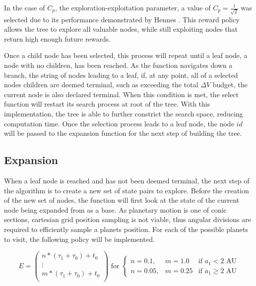 \documentclass[letterpaper, preprint, paper,11pt]{AAS}	%
\begin{document}
In the case of $C_p$, the exploration-exploitation parameter, a value of $C_p = \frac{1}{\sqrt{2}}$ was selected due to its performance demonstrated by Hennes \cite{Hennes2015}. This reward policy allows the tree to explore all valuable nodes, while still exploiting nodes that return high enough future rewards.

Once a child node has been selected, this process will repeat until a leaf node, a node with no children, has been reached. As the function navigates down a branch, the string of nodes leading to a leaf, if, at any point, all of a selected nodes children are deemed terminal, such as exceeding the total $\Delta V$ budget, the current node is also declared terminal. When this condition is met, the select function will restart its search process at root of the tree. With this implementation, the tree is able to further constrict the search space, reducing computation time. Once the selection process leads to a leaf node, the node $id$ will be passed to the expansion function for the next step of building the tree. %

\subsection{Expansion}
When a leaf node is reached and has not been deemed terminal, the next step of the algorithm is to create a new set of state pairs to explore. Before the creation of the new set of nodes, the function will first look at the state of the current node being expanded from as a base. As planetary motion is one of conic sections, cartesian grid position sampling is not viable, thus angular divisions are required to efficiently sample a planets position. For each of the possible planets to visit, the following policy will be implemented. 

\begin{equation}
    \label{eq:ephemArray}
    E = 
    \left(\begin{array}{c}
        n*(\tau_1 + \tau_0) + t_0 \\ 
        \vdots \\
        m*(\tau_1 + \tau_0) + t_0 \\
    \end{array}\right)
    \text{ for } 
    \left\{\begin{array}{lll} 
        n = 0.1, & m = 1.0 &\text{if } a_1 < 2 \text{ AU} \\ 
        n = 0.05, & m = 0.25 &\text{if } a_1 \geq 2 \text{ AU}
    \end{array}\right.
\end{equation}
\end{document}

